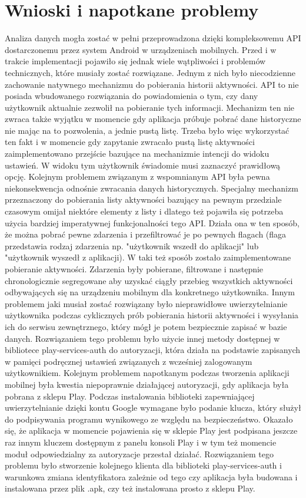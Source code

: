\documentclass[a4paper,twoside,12pt]{book}
\begin{document}
\chapter{Wnioski i napotkane problemy}
Analiza danych mogła zostać w pełni przeprowadzona dzięki kompleksowemu API dostarczonemu przez system Android w urządzeniach mobilnych. Przed i w trakcie implementacji pojawiło się jednak wiele wątpliwości i problemów technicznych, które musiały zostać rozwiązane. Jednym z nich było niecodzienne zachowanie natywnego mechanizmu do pobierania historii aktywności. API to nie posiada wbudowanego rozwiązania do powiadomienia o tym, czy dany użytkownik aktualnie zezwolił na pobieranie tych informacji. Mechanizm ten nie zwraca także wyjątku w momencie gdy aplikacja próbuje pobrać dane historyczne nie mając na to pozwolenia, a jednie pustą listę. Trzeba było więc wykorzystać ten fakt i w momencie gdy zapytanie zwracało pustą listę aktywności zaimplementowano przejście bazujące na mechanizmie intencji do widoku ustawień. W widoku tym użytkownik świadomie musi zaznaczyć prawidłową opcję. Kolejnym problemem związanym z wspomnianym API była pewna niekonsekwencja odnośnie zwracania danych historycznych. Specjalny mechanizm przeznaczony do pobierania listy aktywności bazujący na pewnym przedziale czasowym omijał niektóre elementy z listy i dlatego też pojawiła się potrzeba użycia bardziej imperatywnej funkcjonalności tego API. Działa ona w ten sposób, że można pobrać pewne zdarzenia i przefiltrować je po pewnych flagach (flaga przedstawia rodzaj zdarzenia np. "użytkownik wszedł do aplikacji" lub "użytkownik wyszedł z aplikacji). W taki też sposób zostało zaimplementowane pobieranie aktywności. Zdarzenia były pobierane, filtrowane i następnie chronologicznie segregowane aby uzyskać ciągły przebieg wszystkich aktywności odbywających się na urządzeniu mobilnym dla konkretnego użytkownika. Innym problemem jaki musiał zostać rozwiązany było nieprawidłowe uwierzytelnianie użytkownika podczas cyklicznych prób pobierania historii aktywności i wysyłania ich do serwisu zewnętrznego, który mógł je potem bezpiecznie zapisać w bazie danych. Rozwiązaniem tego problemu było użycie innej metody dostępnej w bibliotece play-services-auth do autoryzacji, która działa na podstawie zapisanych w pamięci podręcznej ustawień związanych z wcześniej zalogowanym użytkownikiem. Kolejnym problemem napotkanym podczas tworzenia aplikacji mobilnej była kwestia niepoprawnie działającej autoryzacji, gdy aplikacja była pobrana z sklepu Play. Podczas instalowania biblioteki zapewniającej uwierzytelnianie dzięki kontu Google wymagane było podanie klucza, który służył do podpisywania programu wynikowego ze względu na bezpieczeństwo. Okazało się, że aplikacja w momencie pojawienia się w sklepie Play jest podpisana jeszcze raz innym kluczem dostępnym z panelu konsoli Play i w tym też momencie moduł odpowiedzialny za autoryzacje przestał działać. Rozwiązaniem tego problemu było stworzenie kolejnego klienta dla biblioteki play-services-auth i warunkowa zmiana identyfikatora zależnie od tego czy aplikacja była budowana i instalowana przez plik .apk, czy też instalowana prosto z sklepu Play. 
\end{document}
